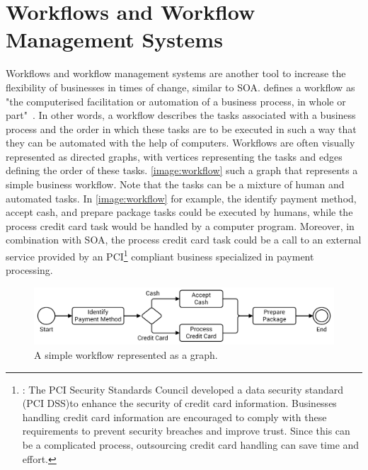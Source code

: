\section{Workflows and Workflow Management Systems}

Workflows and workflow management systems are another tool to increase the flexibility of businesses in times of change, similar to SOA.
\citeauthor*{workflow:referencemodel} defines a workflow as "the computerised facilitation or automation of a business process, in whole or part"~\autocite{workflow:referencemodel}.
In other words, a workflow describes the tasks associated with a business process and the order in which these tasks are to be executed in such a way that they can be automated with the help of computers.
Workflows are often visually represented as directed graphs, with vertices representing the tasks and edges defining the order of these tasks.
\autoref{image:workflow} such a graph that represents a simple business workflow.
Note that the tasks can be a mixture of human and automated tasks.
In \autoref{image:workflow} for example, the identify payment method, accept cash, and prepare package tasks could be executed by humans, while the process credit card task would be handled by a computer program.
Moreover, in combination with SOA, the process credit card task could be a call to an external service provided by an PCI\footnote{: The PCI Security Standards Council developed a data security standard (PCI DSS)\footnotemark to enhance the security of credit card information. Businesses handling credit card information are encouraged to comply with these requirements to prevent security breaches and improve trust. Since this can be a complicated process, outsourcing credit card handling can save time and effort.} compliant business specialized in payment processing.


\begin{figure}[!htbp]
	\centering
	\includegraphics[resolution=600]{fundamentals/assets/workflow}
	\caption{A simple workflow represented as a graph.}
	\label{image:workflow}
\end{figure}

